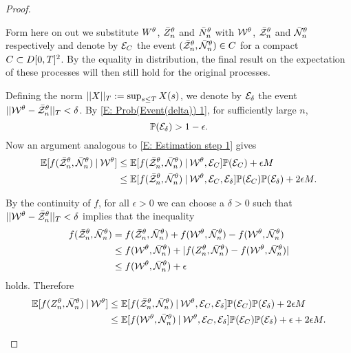 \begin{proof}
\begin{proofpart}
Form here on out we substitute $\Wt$, $\rznt$ and $\rnnt$ with $\WtX$, $\rzntX$ and $\rnntX$ respectively
and denote by $\Event{C}$ the event $(\rzntX, \rnntX) \in C$ for a compact $C \subset \DT^2$.
By the equality in distribution, the final result on the expectation of these processes will then still hold for the original processes.

Defining the norm $\norm{X}_T := \sup_{s \leq T}X(s)$, we denote by $\Event{\delta}$ the event $\norm{\WtX - \rzntX}_T < \delta$.
By \eqref{E: Prob(Event(delta)) 1}, for sufficiently large $n$, 
\begin{equation} \label{E: Prob Event delta}
\Prob(\Event{\delta}) > 1 - \epsilon.
\end{equation}
Now an argument analogous to \eqref{E: Estimation step 1} gives
\begin{equation} \label{E: Estimation step 2}
\begin{aligned}
\Exp{f(\rzntX, \rnntX) \cond \WtX} 
&\leq \Exp{f(\rzntX, \rnntX) \cond \WtX, \Event{C}}\Prob(\Event{C}) + \epsilon M \\
&\leq \Exp{f(\rzntX, \rnntX) \cond \WtX, \Event{C}, \Event{\delta}}\Prob(\Event{C})\Prob(\Event{\delta}) + 2 \epsilon M.
\end{aligned}
\end{equation}

By the continuity of $f$, for all $\epsilon>0$ we can choose a $\delta > 0$ such that $\norm{\WtX - \rzntX}_T < \delta$ implies
that the inequality
\begin{equation*}
\begin{aligned}
f(\rzntX, \rnntX) &= f(\rzntX, \rnntX) + f(\WtX, \rnntX) - f(\WtX, \rnntX) \\
&\leq f(\WtX, \rnntX) + |f(\znt, \rnntX) - f(\WtX, \rnntX)| \\
&\leq f(\WtX, \rnntX) + \epsilon
\end{aligned}
\end{equation*}
holds. Therefore
\begin{equation} \label{E: Estimation step 3}
\begin{aligned}
\Exp{f(\znt, \rnntX) \cond \WtX} 
&\leq \Exp{f(\rzntX, \rnntX) \cond \WtX, \Event{C}, \Event{\delta}}\Prob(\Event{C})\Prob(\Event{\delta}) + 2 \epsilon M \\
&\leq \Exp{f(\WtX, \rnntX) \cond \WtX, \Event{C}, \Event{\delta}}\Prob(\Event{C})\Prob(\Event{\delta}) + \epsilon + 2 \epsilon M.
\end{aligned}
\end{equation}
\end{proofpart}




\end{proof}
